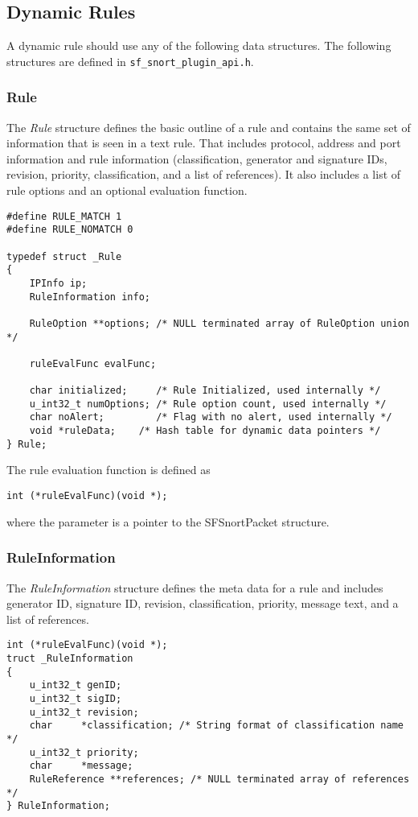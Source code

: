 \documentclass[english]{report}
\begin{document}
\subsection{Dynamic Rules}
A dynamic rule should use any of the following data structures.  The
following structures are defined in \texttt{sf\_snort\_plugin\_api.h}.

\subsubsection{Rule}
The {\em Rule} structure defines the basic outline of a rule and
contains the same set of information that is seen in a text rule.
That includes protocol, address and port information and rule information
(classification, generator and signature IDs, revision, priority,
classification, and a list of references).  It also includes a list of
rule options and an optional evaluation function.

\begin{verbatim}
#define RULE_MATCH 1
#define RULE_NOMATCH 0

typedef struct _Rule
{
    IPInfo ip;
    RuleInformation info;

    RuleOption **options; /* NULL terminated array of RuleOption union */

    ruleEvalFunc evalFunc;

    char initialized;     /* Rule Initialized, used internally */
    u_int32_t numOptions; /* Rule option count, used internally */
    char noAlert;         /* Flag with no alert, used internally */
    void *ruleData;    /* Hash table for dynamic data pointers */
} Rule;
\end{verbatim}

The rule evaluation function is defined as

\begin{verbatim}
int (*ruleEvalFunc)(void *);
\end{verbatim}

where the parameter is a pointer to the SFSnortPacket structure.

\subsubsection{RuleInformation}
The {\em RuleInformation} structure defines the meta data for a rule
and includes generator ID, signature ID, revision, classification,
priority, message text, and a list of references.

\begin{verbatim}
int (*ruleEvalFunc)(void *);
truct _RuleInformation
{
    u_int32_t genID;
    u_int32_t sigID;
    u_int32_t revision;
    char     *classification; /* String format of classification name */
    u_int32_t priority;
    char     *message;
    RuleReference **references; /* NULL terminated array of references */
} RuleInformation;
\end{verbatim}
\end{document}
